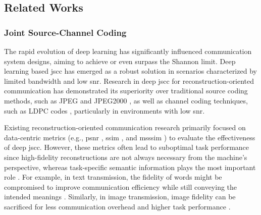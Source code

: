 \subsection{Related Works}
\subsubsection{Joint Source-Channel Coding}
The rapid evolution of deep learning has significantly influenced communication system designs, aiming to achieve or even surpass the Shannon limit. Deep learning based \gls{jscc} has emerged as a robust solution in scenarios characterized by limited bandwidth and low \gls{snr}. Research in deep \gls{jscc} for reconstruction-oriented communication \cite{Kurka_2019_SRo, Bourtsoulatze_2019_DJS, Kurka_2020_DfD} has demonstrated its superiority over traditional source coding methods, such as JPEG \cite{Wallace_1992_TJs} and JPEG2000 \cite{Taubman_2002_JIc}, as well as channel coding techniques, such as LDPC codes \cite{Gallager_1962_Ldp}, particularly in environments with low \gls{snr}.

Existing reconstruction-oriented communication research primarily focused on data-centric metrics (e.g., \gls{psnr} \cite{Kurka_2019_SRo, Tung_2022_DQC, Yang_2022_OGD, Tung_2022_DLA, Kurka_2020_DfD}, \gls{ssim} \cite{Bourtsoulatze_2019_DJS, Tung_2022_DLA, Yang_2022_OGD, Kurka_2020_DfD}, and \gls{msssim} \cite{Yang_2022_OGD, Tung_2022_DLA, Kurka_2020_DfD}) to evaluate the effectiveness of deep \gls{jscc}. However, these metrics often lead to suboptimal task performance since high-fidelity reconstructions are not always necessary from the machine's perspective, whereas task-specific semantic information plays the most important role \cite{Chaccour_2024_LDM, Yang_2023_SCf, Qin_2021_ScP, Strinati_2024_GOa, Pandey_2023_GOC, Kang_2023_PSi}. For example, in text transmission, the fidelity of words might be compromised to improve communication efficiency while still conveying the intended meanings \cite{Xie_2021_DLE, Farsad_2018_DLf}. Similarly, in image transmission, image fidelity can be sacrificed for less communication overhead and higher task performance \cite{Hu_2022_RSC, Diao_2024_TOS, Diao_2024_TTG}. 

